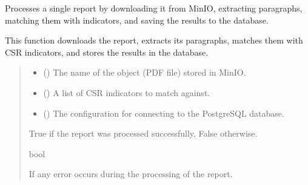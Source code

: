 \documentclass[letterpaper,10pt,english]{sphinxmanual}
\begin{document}
\begin{fulllineitems}
\label{\detokenize{modules.data_storage:modules.data_storage.retry_failed_reports.process_single_report}}
\pysigstartsignatures
\pysiglinewithargsret
{}
{\sphinxparamcomma {}\sphinxparamcomma {}}
{}
\pysigstopsignatures
\sphinxAtStartPar
Processes a single report by downloading it from MinIO, extracting paragraphs,
matching them with indicators, and saving the results to the database.

\sphinxAtStartPar
This function downloads the report, extracts its paragraphs, matches them with
CSR indicators, and stores the results in the database.
\begin{quote}\begin{description}
\begin{itemize}
\item {} 
\sphinxAtStartPar
{} () \textendash{} The name of the object (PDF file) stored in MinIO.

\item {} 
\sphinxAtStartPar
{} (\sphinxstyleliteralemphasis{\sphinxupquote{ (}}\sphinxstyleliteralemphasis{\sphinxupquote{, }}\sphinxstyleliteralemphasis{\sphinxupquote{, }}\sphinxstyleliteralemphasis{\sphinxupquote{)}}) \textendash{} A list of CSR indicators to match against.

\item {} 
\sphinxAtStartPar
{} () \textendash{} The configuration for connecting to the PostgreSQL database.

\end{itemize}

\sphinxAtStartPar
True if the report was processed successfully, False otherwise.

\sphinxAtStartPar
bool

\sphinxAtStartPar
{} \textendash{} If any error occurs during the processing of the report.

\end{description}\end{quote}

\end{fulllineitems}
\end{document}
